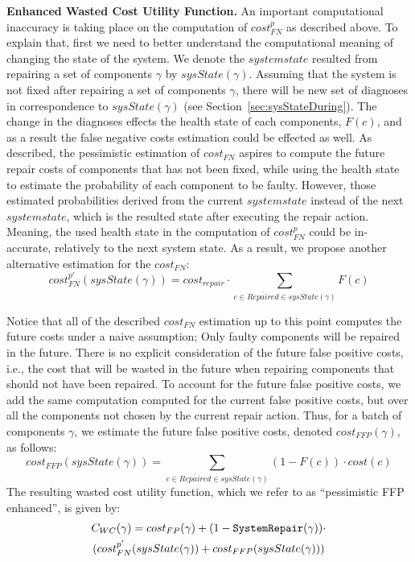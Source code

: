 \documentclass[review]{elsarticle}
\newcommand\sysrep[1]{{\tt SystemRepair(#1)}}
\begin{document}
\noindent \textbf{Enhanced Wasted Cost Utility Function.}
An important computational inaccuracy is taking place on the computation of $cost_{FN}^p$ as described above. To explain that, first we need to better understand the computational meaning of changing the state of the system. We denote the $system state$ resulted from repairing a set of components $\gamma$ by $sysState(\gamma)$. Assuming that the system is not fixed after repairing a set of components $\gamma$, there will be new set of diagnoses in correspondence to $sysState(\gamma)$ (see Section~\ref{sec:sysStateDuring}).
The change in the diagnoses effects the health state of each components, $F(c)$, and as a result the false negative costs estimation could be effected as well. As described, the pessimistic estimation of $cost_{FN}$ aspires to compute the future repair costs of components that has not been fixed, while using the health state to estimate the probability of each component to be faulty. However, those estimated probabilities derived from the current $system state$ instead of the next $system state$, which is the resulted state after executing the repair action. Meaning, the used health state in the computation of $cost_{FN}^p$ could be in-accurate, relatively to the next system state.
As a result, we propose another alternative estimation for the $cost_{FN}$:
\[ cost_{FN}^{{{p}'}}(sysState(\gamma))=cost_{repair}\cdot \sum_{c\in \overline{Repaired} \in sysState(\gamma)} F(c)\]

Notice that all of the described $cost_{FN}$ estimation up to this point computes the future costs under a naive assumption; Only faulty components will be repaired in the future. There is no explicit consideration of the future false positive costs, i.e., the cost that will be wasted in the future when repairing components that should not have been repaired. 
To account for the future false positive costs, we add the same computation computed for the current false positive costs, but over all the components not chosen by the current repair action. 
Thus, for a batch of components $\gamma$, we estimate the future false positive costs, denoted $cost_{FFP}(\gamma)$, as follows:
\[
cost_{FFP}(sysState(\gamma))=\sum_{c\in \overline{Repaired} \in sysState(\gamma)} (1-F(c))\cdot cost(c) 
\] 
The resulting wasted cost utility function, which we refer to as ``pessimistic FFP enhanced'',  is given by:
\begin{multline}
C_{WC}(\gamma)=cost_{FP}(\gamma)+(1-\sysrep{\gamma}) \cdot \\ (cost_{FN}^{{{p}'}}(sysState(\gamma))+ cost_{FFP}(sysState(\gamma)))
\end{multline}
\end{document}
